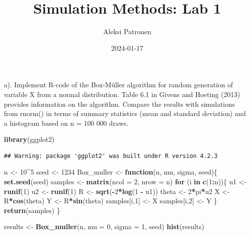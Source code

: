\documentclass[
]{article}
\title{Simulation Methods: Lab 1}
\author{Aleksi Patronen}
\date{2024-01-17}
\newenvironment{Shaded}{\begin{snugshade}}{\end{snugshade}}
\newcommand{\AttributeTok}[1]{\textcolor[rgb]{0.13,0.29,0.53}{#1}}
\newcommand{\ControlFlowTok}[1]{\textcolor[rgb]{0.13,0.29,0.53}{\textbf{#1}}}
\newcommand{\DecValTok}[1]{\textcolor[rgb]{0.00,0.00,0.81}{#1}}
\newcommand{\FunctionTok}[1]{\textcolor[rgb]{0.13,0.29,0.53}{\textbf{#1}}}
\newcommand{\NormalTok}[1]{#1}
\newcommand{\OtherTok}[1]{\textcolor[rgb]{0.56,0.35,0.01}{#1}}
\newcommand{\SpecialCharTok}[1]{\textcolor[rgb]{0.81,0.36,0.00}{\textbf{#1}}}
\begin{document}
\maketitle

a). Implement R-code of the Box-Müller algorithm for random generation
of variable X from a normal distribution. Table 6.1 in Givens and
Hoeting (2013) provides information on the algorithm. Compare the
results with simulations from rnorm() in terms of summary statistics
(mean and standard deviation) and a histogram based on n = 100 000
draws.

\begin{Shaded}
\begin{Highlighting}[]
\FunctionTok{library}\NormalTok{(ggplot2)}
\end{Highlighting}
\end{Shaded}

\begin{verbatim}
## Warning: package 'ggplot2' was built under R version 4.2.3
\end{verbatim}

\begin{Shaded}
\begin{Highlighting}[]
\NormalTok{n }\OtherTok{\textless{}{-}} \DecValTok{10}\SpecialCharTok{\^{}}\DecValTok{5}
\NormalTok{seed }\OtherTok{\textless{}{-}} \DecValTok{1234}
\NormalTok{Box\_muller }\OtherTok{\textless{}{-}} \ControlFlowTok{function}\NormalTok{(n, mu, sigma, seed)\{}
  \FunctionTok{set.seed}\NormalTok{(seed)}
\NormalTok{  samples }\OtherTok{\textless{}{-}} \FunctionTok{matrix}\NormalTok{(}\AttributeTok{ncol =} \DecValTok{2}\NormalTok{, }\AttributeTok{nrow =}\NormalTok{ n)}
   \ControlFlowTok{for}\NormalTok{ (i }\ControlFlowTok{in} \FunctionTok{c}\NormalTok{(}\DecValTok{1}\SpecialCharTok{:}\NormalTok{n))\{}
\NormalTok{     u1 }\OtherTok{\textless{}{-}} \FunctionTok{runif}\NormalTok{(}\DecValTok{1}\NormalTok{)}
\NormalTok{     u2 }\OtherTok{\textless{}{-}} \FunctionTok{runif}\NormalTok{(}\DecValTok{1}\NormalTok{)}
\NormalTok{     R }\OtherTok{\textless{}{-}} \FunctionTok{sqrt}\NormalTok{(}\SpecialCharTok{{-}}\DecValTok{2}\SpecialCharTok{*}\FunctionTok{log}\NormalTok{(}\DecValTok{1} \SpecialCharTok{{-}}\NormalTok{ u1))}
\NormalTok{     theta }\OtherTok{\textless{}{-}} \DecValTok{2}\SpecialCharTok{*}\NormalTok{pi}\SpecialCharTok{*}\NormalTok{u2}
\NormalTok{     X }\OtherTok{\textless{}{-}}\NormalTok{ R}\SpecialCharTok{*}\FunctionTok{cos}\NormalTok{(theta)}
\NormalTok{     Y }\OtherTok{\textless{}{-}}\NormalTok{ R}\SpecialCharTok{*}\FunctionTok{sin}\NormalTok{(theta)}
\NormalTok{     samples[i,}\DecValTok{1}\NormalTok{] }\OtherTok{\textless{}{-}}\NormalTok{ X }
\NormalTok{     samples[i,}\DecValTok{2}\NormalTok{] }\OtherTok{\textless{}{-}}\NormalTok{ Y}
\NormalTok{   \}}
  \FunctionTok{return}\NormalTok{(samples)  }
\NormalTok{\}}



\NormalTok{results }\OtherTok{\textless{}{-}} \FunctionTok{Box\_muller}\NormalTok{(n, }\AttributeTok{mu =} \DecValTok{0}\NormalTok{, }\AttributeTok{sigma =} \DecValTok{1}\NormalTok{, seed)}
\FunctionTok{hist}\NormalTok{(results)}
\end{Highlighting}
\end{Shaded}
\end{document}
